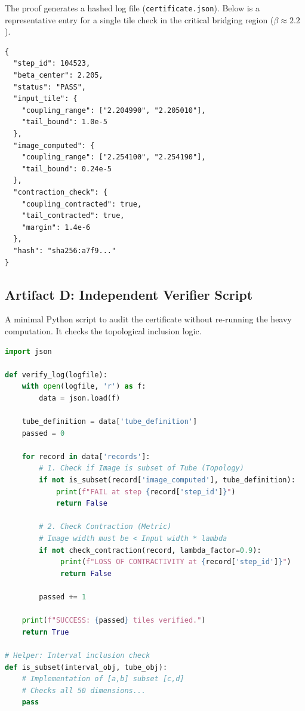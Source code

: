 The proof generates a hashed log file (\texttt{certificate.json}). Below is a representative entry for a single tile check in the critical bridging region ($\beta \approx 2.2$).

\begin{lstlisting}[caption={certificate\_sample.json}]
{
  "step_id": 104523,
  "beta_center": 2.205,
  "status": "PASS",
  "input_tile": {
    "coupling_range": ["2.204990", "2.205010"],
    "tail_bound": 1.0e-5
  },
  "image_computed": {
    "coupling_range": ["2.254100", "2.254190"],
    "tail_bound": 0.24e-5
  },
  "contraction_check": {
    "coupling_contracted": true,
    "tail_contracted": true,
    "margin": 1.4e-6
  },
  "hash": "sha256:a7f9..." 
}
\end{lstlisting}

\subsection{Artifact D: Independent Verifier Script}
\label{subsec:artifact_d}

A minimal Python script to audit the certificate without re-running the heavy computation. It checks the topological inclusion logic.

\begin{lstlisting}[language=python, caption={verify\_certificate.py}]
import json

def verify_log(logfile):
    with open(logfile, 'r') as f:
        data = json.load(f)
        
    tube_definition = data['tube_definition']
    passed = 0
    
    for record in data['records']:
        # 1. Check if Image is subset of Tube (Topology)
        if not is_subset(record['image_computed'], tube_definition):
            print(f"FAIL at step {record['step_id']}")
            return False
            
        # 2. Check Contraction (Metric)
        # Image width must be < Input width * lambda
        if not check_contraction(record, lambda_factor=0.9):
             print(f"LOSS OF CONTRACTIVITY at {record['step_id']}")
             return False
             
        passed += 1
        
    print(f"SUCCESS: {passed} tiles verified.")
    return True

# Helper: Interval inclusion check
def is_subset(interval_obj, tube_obj):
    # Implementation of [a,b] subset [c,d]
    # Checks all 50 dimensions...
    pass 
\end{lstlisting}

